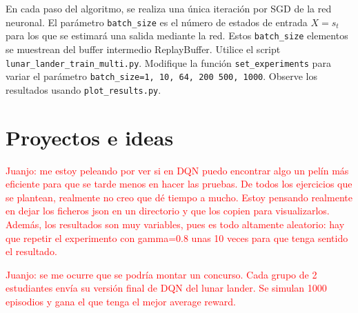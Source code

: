 \documentclass{article}
\begin{document}
\begin{exercise}
En cada paso del algoritmo, se realiza una única iteración por SGD de la red neuronal. El parámetro \texttt{batch\_size} es el número de estados de entrada $X=s_t$ para los que se estimará una salida mediante la red. Estos \texttt{batch\_size} elementos se muestrean del buffer intermedio ReplayBuffer. Utilice el script \texttt{lunar\_lander\_train\_multi.py}. Modifique la función \texttt{set\_experiments} para variar el parámetro \texttt{batch\_size=1, 10, 64, 200 500, 1000}. Observe los resultados usando \texttt{plot\_results.py}.
\end{exercise}


\section{Proyectos e ideas}

\begin{exercise}
    \textcolor{red}{Juanjo: me estoy peleando por ver si en DQN puedo encontrar algo un pelín más eficiente para que se tarde menos en hacer las pruebas. De todos los ejercicios que se plantean, realmente no creo que dé tiempo a mucho. Estoy pensando realmente en dejar los ficheros json en un directorio y que los copien para visualizarlos. Además, los resultados son muy variables, pues es todo altamente aleatorio: hay que repetir el experimento con gamma=0.8 unas 10 veces para que tenga sentido el resultado.}
\end{exercise}

\begin{exercise}
    \textcolor{red}{Juanjo: se me ocurre que se podría montar un concurso. Cada grupo de 2 estudiantes envía su versión final de DQN del lunar lander. Se simulan 1000 episodios y gana el que tenga el mejor average reward.}
\end{exercise}





\end{document}
